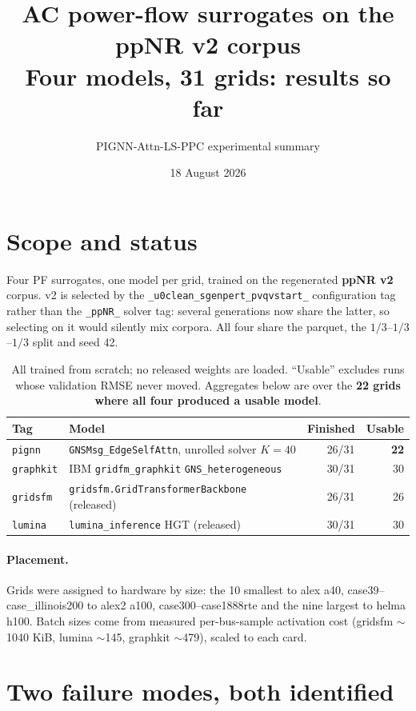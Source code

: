 \documentclass[10pt]{article}
\title{AC power-flow surrogates on the ppNR v2 corpus\\\large Four models, 31 grids: results so far}
\author{PIGNN-Attn-LS-PPC experimental summary}
\date{18 August 2026}
\begin{document}
\maketitle

\section{Scope and status}

Four PF surrogates, one model per grid, trained on the regenerated \textbf{ppNR
v2} corpus. v2 is selected by the \texttt{\_u0clean\_sgenpert\_pvqvstart\_}
configuration tag rather than the \texttt{\_ppNR\_} solver tag: several
generations now share the latter, so selecting on it would silently mix corpora.
All four share the parquet, the $1/3$--$1/3$--$1/3$ split and seed 42.

\begin{table}[H]
\centering\small
\begin{tabular}{llrr}
\toprule
Tag & Model & Finished & Usable \\
\midrule
\texttt{pignn}    & \texttt{GNSMsg\_EdgeSelfAttn}, unrolled solver $K=40$ & 26/31 & \textbf{22} \\
\texttt{graphkit} & IBM \texttt{gridfm\_graphkit} \texttt{GNS\_heterogeneous} & 30/31 & 30 \\
\texttt{gridsfm}  & \texttt{gridsfm.GridTransformerBackbone} (released) & 26/31 & 26 \\
\texttt{lumina}   & \texttt{lumina\_inference} HGT (released) & 30/31 & 30 \\
\bottomrule
\end{tabular}
\caption{All trained from scratch; no released weights are loaded. ``Usable''
excludes runs whose validation RMSE never moved. Aggregates below are over the
\textbf{22 grids where all four produced a usable model}.}
\end{table}

\paragraph{Placement.} Grids were assigned to hardware by size: the 10 smallest
to alex a40, case39--case\_illinois200 to alex2 a100, case300--case1888rte and
the nine largest to helma h100. Batch sizes come from measured per-bus-sample
activation cost (gridsfm $\sim$1040 KiB, lumina $\sim$145, graphkit $\sim$479),
scaled to each card.

\section{Two failure modes, both identified}
\end{document}
